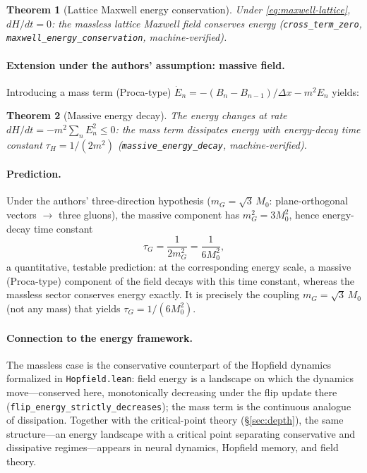 \documentclass[journal]{IEEEtran}
\newtheorem{theorem}{Theorem}
\begin{document}
\begin{theorem}[Lattice Maxwell energy conservation]\label{thm:maxwell}
Under \eqref{eq:maxwell-lattice}, $dH/dt = 0$: the massless lattice Maxwell
field conserves energy
(\texttt{cross\_term\_zero}, \texttt{maxwell\_energy\_conservation},
machine-verified).
\end{theorem}

\paragraph{Extension under the authors' assumption: massive field.}
Introducing a mass term (Proca-type)
$\dot E_n = -(B_n - B_{n-1})/\Delta x - m^2 E_n$ yields:

\begin{theorem}[Massive energy decay]\label{thm:massive}
The energy changes at rate $dH/dt = -m^2\sum_n E_n^2 \le 0$: the mass term
dissipates energy with energy-decay time constant $\tau_H = 1/(2m^2)$
(\texttt{massive\_energy\_decay}, machine-verified).
\end{theorem}

\paragraph{Prediction.}
Under the authors' three-direction hypothesis ($m_G = \sqrt{3}\,M_0$:
plane-orthogonal vectors $\to$ three gluons), the massive component has
$m_G^2 = 3M_0^2$, hence energy-decay time constant
\begin{equation}
\label{eq:tau-g}
\tau_G = \frac{1}{2 m_G^2} = \frac{1}{6 M_0^2},
\end{equation}
a quantitative, testable prediction: at the corresponding energy scale, a
massive (Proca-type) component of the field decays with this time constant,
whereas the massless sector conserves energy exactly. It is precisely the
coupling $m_G = \sqrt3\,M_0$ (not any mass) that yields $\tau_G = 1/(6M_0^2)$.

\paragraph{Connection to the energy framework.}
The massless case is the conservative counterpart of the Hopfield dynamics
formalized in \texttt{Hopfield.lean}: field energy is a landscape on which the
dynamics move---conserved here, monotonically decreasing under the flip
update there (\texttt{flip\_energy\_strictly\_decreases}); the mass term is
the continuous analogue of dissipation. Together with the critical-point
theory (\S\ref{sec:depth}), the same structure---an energy landscape with a
critical point separating conservative and dissipative regimes---appears in
neural dynamics, Hopfield memory, and field theory.
\end{document}
